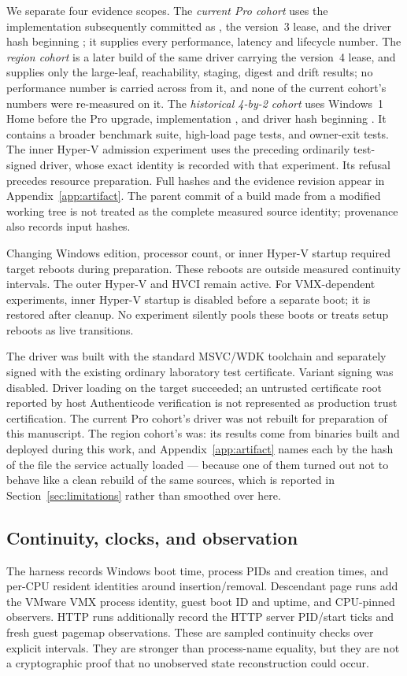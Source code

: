 We separate four evidence scopes. The \emph{current Pro cohort} uses the
implementation subsequently committed as , the version~3 lease,
and the driver hash beginning ; it supplies every performance,
latency and lifecycle number. The \emph{region cohort} is a later build of the
same driver carrying the version~4 lease, and supplies only the large-leaf,
reachability, staging, digest and drift results; no performance number is
carried across from it, and none of the current cohort's numbers were re-measured
on it. The \emph{historical 4-by-2 cohort}
uses Windows~1 Home before the Pro upgrade, implementation , and
driver hash beginning . It contains a broader benchmark suite,
high-load page tests, and owner-exit tests. The inner Hyper-V admission experiment
uses the preceding ordinarily test-signed driver, whose exact identity is
recorded with that experiment. Its refusal precedes resource preparation.
Full hashes and the evidence revision appear in Appendix~\ref{app:artifact}.
The parent commit of a build made from a modified working tree is not treated
as the complete measured source identity; provenance also records input hashes.

Changing Windows edition, processor count, or inner Hyper-V startup required
target reboots during preparation. These reboots are outside measured continuity
intervals. The outer Hyper-V and HVCI remain active. For VMX-dependent experiments,
inner Hyper-V startup is disabled before a separate boot; it is restored after
cleanup. No experiment silently pools these boots or treats setup reboots as
live transitions.

The driver was built with the standard MSVC/WDK toolchain and separately signed
with the existing ordinary laboratory test certificate. Variant signing was
disabled. Driver loading on the target succeeded; an untrusted certificate root
reported by host Authenticode verification is not represented as production
trust certification. The current Pro cohort's driver was not rebuilt for
preparation of this manuscript. The region cohort's was: its results come from
binaries built and deployed during this work, and Appendix~\ref{app:artifact}
names each by the hash of the file the service actually loaded --- because one
of them turned out not to behave like a clean rebuild of the same sources, which
is reported in Section~\ref{sec:limitations} rather than smoothed over here.

\subsection{Continuity, clocks, and observation}
The harness records Windows boot time, process PIDs and creation times, and
per-CPU resident identities around insertion/removal. Descendant page runs add
the VMware VMX process identity, guest boot ID and uptime, and CPU-pinned
observers. HTTP runs additionally record the HTTP server PID/start ticks and
fresh guest pagemap observations. These are sampled continuity checks over
explicit intervals. They are stronger than process-name equality, but they are
not a cryptographic proof that no unobserved state reconstruction could occur.

